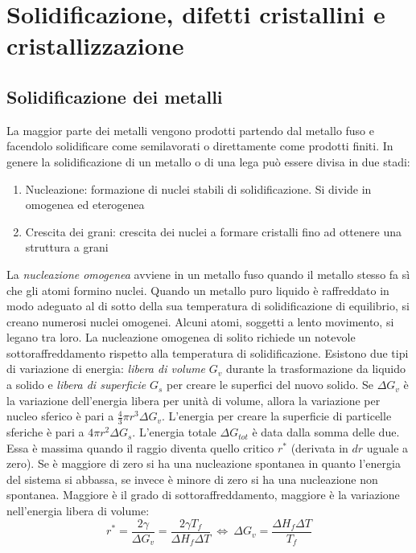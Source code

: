 \documentclass[a5paper,12pt]{article}
\begin{document}
\section{Solidificazione, difetti cristallini e cristallizzazione}
\subsection{Solidificazione dei metalli}
La maggior parte dei metalli vengono prodotti partendo dal metallo fuso e facendolo solidificare come semilavorati o direttamente come prodotti finiti. In genere la solidificazione di un metallo o di una lega può essere divisa in due stadi: 
\begin{enumerate}
	\item Nucleazione: formazione di nuclei stabili di solidificazione. Si divide in omogenea ed eterogenea
	\item Crescita dei grani: crescita dei nuclei a formare cristalli fino ad ottenere una struttura a grani
\end{enumerate}

La \emph{nucleazione omogenea} avviene in un metallo fuso quando il metallo stesso fa sì che gli atomi formino nuclei. Quando un metallo puro liquido è raffreddato in modo adeguato al di sotto della sua temperatura di solidificazione di equilibrio, si creano numerosi nuclei omogenei. Alcuni atomi, soggetti a lento movimento, si legano tra loro. La nucleazione omogenea di solito richiede un notevole sottoraffreddamento rispetto alla temperatura di solidificazione. Esistono due tipi di variazione di energia: \emph{libera di volume} $G_v$ durante la trasformazione da liquido a solido e \emph{libera di superficie} $G_s$ per creare le superfici del nuovo solido. Se $\Delta G_v$ è la variazione dell'energia libera per unità di volume, allora la variazione per nucleo sferico è pari a $\frac{4}{3}\pi r^3\Delta G_v$. L'energia per creare la superficie di particelle sferiche è pari a $4 \pi r^2 \Delta G_s$. L'energia totale $\Delta G_{tot}$ è data dalla somma delle due. Essa è massima quando il raggio diventa quello critico $r^*$ (derivata in $dr$ uguale a zero). Se è maggiore di zero si ha una nucleazione spontanea in quanto l'energia del sistema si abbassa, se invece è minore di zero si ha una nucleazione non spontanea. Maggiore è il grado di sottoraffreddamento, maggiore è la variazione nell'energia libera di volume: \[r^* = \frac{2\gamma}{\Delta G_v} = \frac{2 \gamma T_f}{\Delta H_f \Delta T} \: \Longleftrightarrow \: \Delta G_v = \frac{\Delta H_f \Delta T}{T_f}\]
\end{document}
